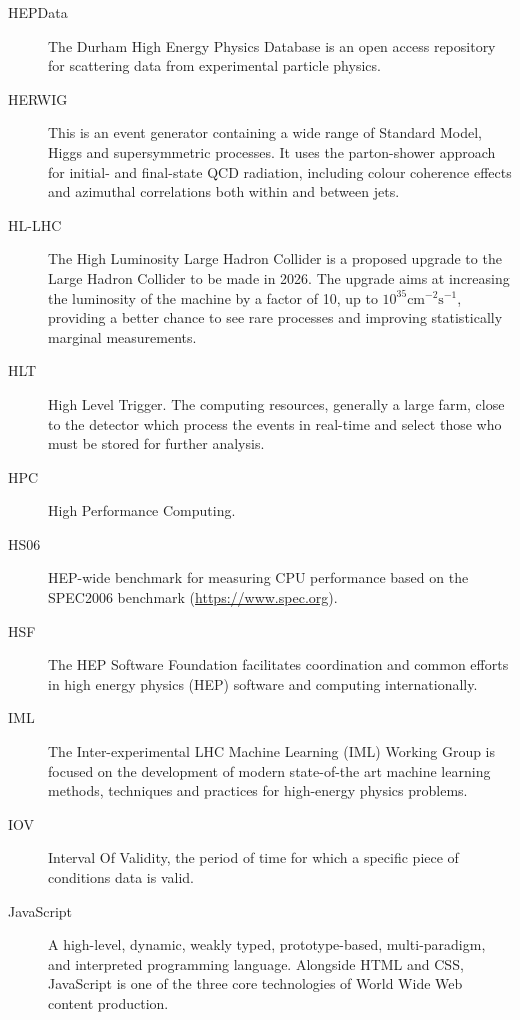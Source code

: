 \documentclass[12pt,a4paper]{article}
\begin{document}
\begin{appendices}
\begin{description}
\item[HEPData] The Durham High Energy Physics Database is an open access
repository for scattering data from experimental particle physics.

\item[HERWIG] This is an event generator containing a wide range of Standard
Model, Higgs and supersymmetric processes. It uses the parton-shower approach
for initial- and final-state QCD radiation, including colour coherence effects and 
azimuthal correlations both within and between jets.

\item[HL-LHC] The High Luminosity Large Hadron Collider is a proposed upgrade to
the Large Hadron Collider to be made in 2026. The upgrade aims at increasing the 
luminosity of the machine by a factor of 10, up to 
$10^{35}\mathrm{cm}^{-2}\mathrm{s}^{-1}$, 
providing a better chance to see rare processes and improving
statistically marginal measurements.

\item[HLT] High Level Trigger. The computing resources, generally a large farm, close to the detector which process the events in real-time and select those who must be stored for further analysis.

\item[HPC] High Performance Computing.

\item[HS06] HEP-wide benchmark for measuring CPU performance based on the SPEC2006 benchmark
(\href{https://www.spec.org}{{https://www.spec.org}}).

\item[HSF] The HEP Software Foundation facilitates coordination and common
efforts in high energy physics (HEP) software and computing
internationally.

\item[IML] The Inter-experimental LHC Machine Learning (IML) Working Group is
focused on the development of modern state-of-the art machine learning
methods, techniques and practices for high-energy physics problems.

\item[IOV] Interval Of Validity, the period of time for which a specific piece
of conditions data is valid.

\item[JavaScript] A high-level, dynamic, weakly typed,
prototype-based, multi-paradigm, and interpreted programming language.
Alongside HTML and CSS, JavaScript is one of the three core technologies
of World Wide Web content production.


\end{description}
\end{appendices}
\end{document}
